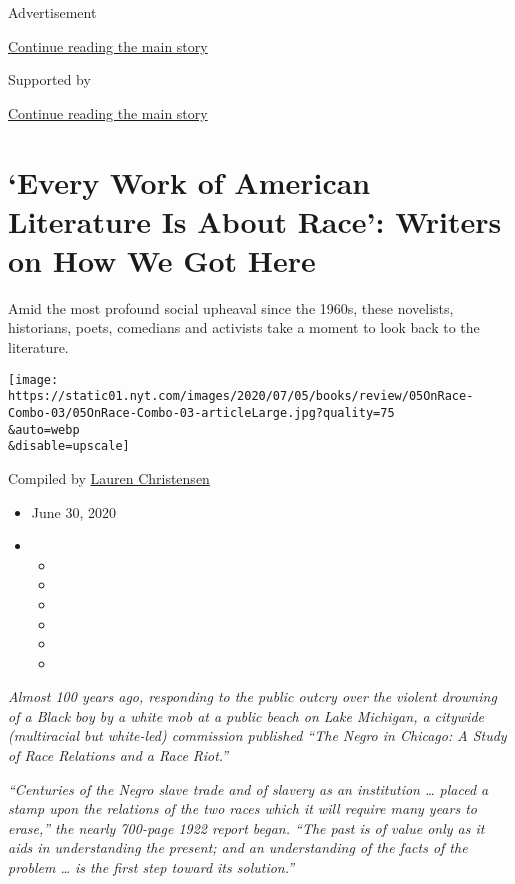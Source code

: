 Advertisement

\protect\hyperlink{after-top}{Continue reading the main story}

Supported by

\protect\hyperlink{after-sponsor}{Continue reading the main story}

\hypertarget{every-work-of-american-literature-is-about-race-writers-on-how-we-got-here}{%
\section{`Every Work of American Literature Is About Race': Writers on
How We Got
Here}\label{every-work-of-american-literature-is-about-race-writers-on-how-we-got-here}}

Amid the most profound social upheaval since the 1960s, these novelists,
historians, poets, comedians and activists take a moment to look back to
the literature.

\texttt{[image: https://static01.nyt.com/images/2020/07/05/books/review/05OnRace-Combo-03/05OnRace-Combo-03-articleLarge.jpg?quality=75\\\&auto=webp\\\&disable=upscale]}

Compiled by \href{https://www.nytimes.com/by/lauren-christensen}{Lauren
Christensen}

\begin{itemize}
\item
  June 30, 2020
\item
  \begin{itemize}
  \item
  \item
  \item
  \item
  \item
  \item
  \end{itemize}
\end{itemize}

\emph{Almost 100 years ago, responding to the public outcry over the
violent drowning of a Black boy by a white mob at a public beach on Lake
Michigan, a citywide (multiracial but white-led) commission published
``The Negro in Chicago: A Study of Race Relations and a Race Riot.''}

\emph{``Centuries of the Negro slave trade and of slavery as an
institution \ldots{} placed a stamp upon the relations of the two races
which it will require many years to erase,'' the nearly 700-page 1922
report began. ``The past is of value only as it aids in understanding
the present; and an understanding of the facts of the problem \ldots{}
is the first step toward its solution.''}

